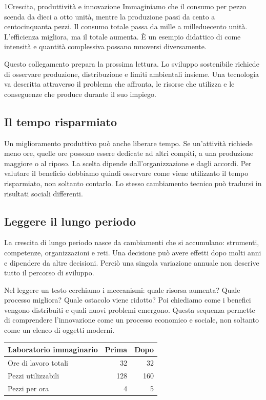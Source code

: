 \begin{lettura}{1}{Crescita, produttività e innovazione}
Immaginiamo che il consumo per pezzo scenda da dieci a otto unità, mentre la produzione passi da cento a centocinquanta pezzi. Il consumo totale passa da mille a milleduecento unità. L'efficienza migliora, ma il totale aumenta. È un esempio didattico di come intensità e quantità complessiva possano muoversi diversamente.

Questo collegamento prepara la prossima lettura. Lo sviluppo sostenibile richiede di osservare produzione, distribuzione e limiti ambientali insieme. Una tecnologia va descritta attraverso il problema che affronta, le risorse che utilizza e le conseguenze che produce durante il suo impiego.

\subsection*{Il tempo risparmiato}
Un miglioramento produttivo può anche liberare tempo. Se un'attività richiede meno ore, quelle ore possono essere dedicate ad altri compiti, a una produzione maggiore o al riposo. La scelta dipende dall'organizzazione e dagli accordi. Per valutare il beneficio dobbiamo quindi osservare come viene utilizzato il tempo risparmiato, non soltanto contarlo. Lo stesso cambiamento tecnico può tradursi in risultati sociali differenti.

\subsection*{Leggere il lungo periodo}
La crescita di lungo periodo nasce da cambiamenti che si accumulano: strumenti, competenze, organizzazioni e reti. Una decisione può avere effetti dopo molti anni e dipendere da altre decisioni. Perciò una singola variazione annuale non descrive tutto il percorso di sviluppo.

Nel leggere un testo cerchiamo i meccanismi: quale risorsa aumenta? Quale processo migliora? Quale ostacolo viene ridotto? Poi chiediamo come i benefici vengono distribuiti e quali nuovi problemi emergono. Questa sequenza permette di comprendere l'innovazione come un processo economico e sociale, non soltanto come un elenco di oggetti moderni.



\begin{center}\begin{minipage}{\linewidth}\centering\small\begin{tabular}{lrr}\toprule
Laboratorio immaginario & Prima & Dopo\\\midrule
Ore di lavoro totali & 32 & 32\\
Pezzi utilizzabili & 128 & 160\\
Pezzi per ora & 4 & 5\\\bottomrule
\end{tabular}
\end{minipage}\end{center}



\end{lettura}
